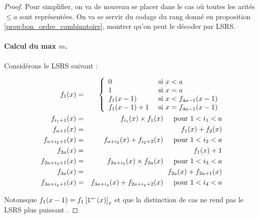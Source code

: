 	\begin{proof}
		Pour simplifier, on va de nouveau se placer dans le cas où toutes les arités $\leqslant a$ sont représentées\footnotemark. On va se servir du codage du rang donné en proposition \ref{prop:bon_ordre_combinatoire}, montrer qu'on peut le décoder par LSRS.
		
			
		\paragraph{Calcul du max $m$.}
			\label{par:calcul_max_bon_ordre}
			Considérons le LSRS suivant :
			
				\begin{eqnarray}
					f_1(x) & = & \left\lbrace \begin{array}{ll} 	
									0 & \text{ si $x < a$} \\
									1 & \text{ si $x = a$} \\
									f_1(x-1) & \text{ si $x < f_{4a-1}(x-1)$} \\
									f_1(x-1)+1 & \text{ si $x = f_{4a-1}(x-1)$}
									 \end{array} \right. 
									\label{eqn:f_0_max_courant}\\
					f_{i_1 + 1}(x) & = & f_{i_1}(x) \times f_1(x) \label{eqn:m_pow_i} \:\:\:\:\: \text{ pour $ 1 < i_1 < a $}\\
					f_{a + 1}(x) & = & f_{1}(x) + f_{2}(x) \label{eqn:sum_m_pow_init}\\
					f_{a + i_2 + 1}(x) & = & f_{a + i_2}(x) + f_{i_2 + 2}(x) \label{eqn:sum_m_pow}  \:\:\:\:\: \text{ pour $ 1 < i_2 < a $}\\
					f_{2a}(x) & = & f_1(x) + 1 \label{eqn:m_plus_1}\\
					f_{2a + i_3 + 1}(x) & = & f_{2a + i_3}(x) \times f_{2a}(x) \label{eqn:m1_pow_i}  \:\:\:\:\: \text{ pour $ 1 < i_3 < a $}\\
					f_{3a}(x) & = & f_{2a}(x) + f_{2a + 1}(x) \label{eqn:sum_m1_pow_init}\\
					f_{3a + i_4 + 1}(x) & = & f_{3a + i_4}(x) + f_{2a + i_4+2}(x) \label{eqn:sum_m1_pow}  \:\:\:\:\: \text{ pour $ 1 < i_4 < a $}
				\end{eqnarray}
		
			Notons\footnotemark que $f_1(x-1) = f_1\left[ 1^{\leftarrow}(x) \right]_{x}$ et que la distinction de cas ne rend pas le LSRS plus puissant \cite{GrandjeanSchwentick2002}. 
			

\end{proof}
